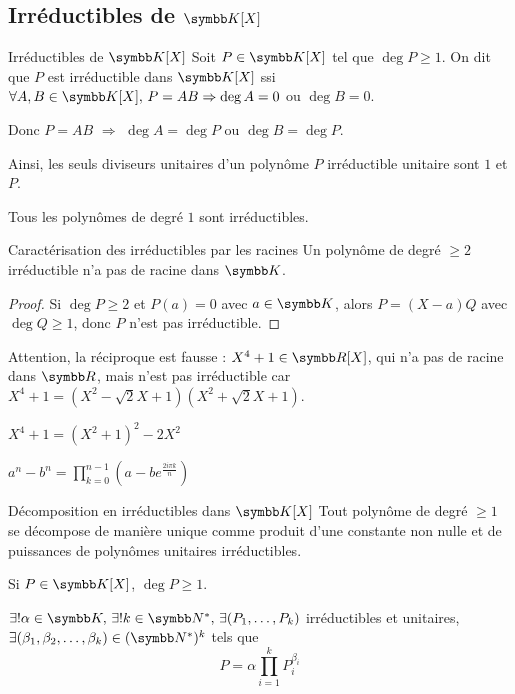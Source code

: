 \subsection{Irréductibles de \texorpdfstring{$\K[X]$}{K[X]}}

\begin{definition}{Irréductibles de $\K[X]$}{}
    Soit $P \in \K[X]$ tel que $\deg P \geqslant 1$. On dit que $P$ est irréductible 
    dans $\K[X]$ ssi $\forall A, B \in \K[X], \, P = AB \Rightarrow \deg A = 0$ ou $\deg B = 0$.

    Donc $P = AB$ $\Rightarrow$ $\deg A = \deg P$ ou $\deg B = \deg P$.

    Ainsi, les seuls diviseurs unitaires d'un polynôme $P$ irréductible unitaire sont 
    $1$ et $P$.
\end{definition}

\begin{exemple}
    Tous les polynômes de degré $1$ sont irréductibles.
\end{exemple}


\begin{proposition}{Caractérisation des irréductibles par les racines}{}
    Un polynôme de degré $\geqslant 2$ irréductible n'a pas de racine dans $\K$.
\end{proposition}

\begin{proof}
    Si $\deg P \geqslant 2$ et $P(a) = 0$ avec $a \in \K$, alors
    $P = (X - a) Q$ avec $\deg Q \geqslant 1$, donc $P$ n'est pas irréductible.
\end{proof}

\begin{remarque}
    Attention, la réciproque est fausse :
    $X^4 + 1 \in \R[X]$, qui n'a pas de racine dans $\R$, mais n'est pas irréductible car 
    $X^4 + 1 = (X^2 - \sqrt 2 X + 1)(X^2 + \sqrt 2 X + 1)$.
\end{remarque}


\avspace $X^4 + 1 = (X^2 + 1)^2 - 2X^2$

$\displaystyle a^n - b^n = \prod_{k = 0}^{n - 1} (a - b e^{\frac{2i\pi k} n})$

\begin{theoreme}{Décomposition en irréductibles dans $\K[X]$}{}
    Tout polynôme de degré $\geqslant 1$ se décompose de manière unique comme produit d'une constante 
    non nulle et de puissances de polynômes unitaires irréductibles. 

    Si $ P \in \K[X]$, $\deg P \geqslant 1$. 

    $\exists ! \alpha \in \K, \, \exists ! k \in \N^*, \, \exists (P_1, \ldots, P_k)$ irréductibles et unitaires, 
    $\exists (\beta_1, \beta_2, \ldots, \beta_k) \in (\N^*)^k$ tels que
    \[P = \alpha \prod_{i = 1}^k P_i^{\beta_i}\]
\end{theoreme}

